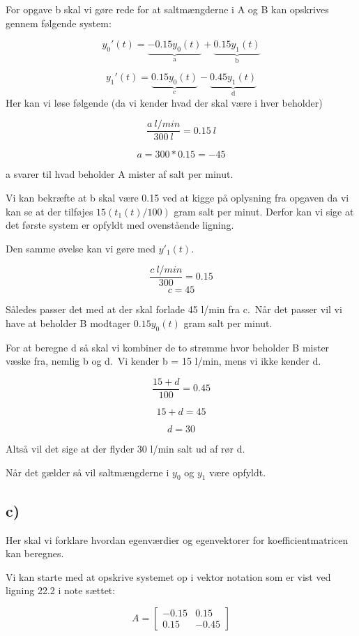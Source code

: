 \documentclass[
]{article}
\begin{document}
For opgave b skal vi gøre rede for at saltmængderne i A og B kan
opskrives gennem følgende system:

\[
y_0'(t)=\underbrace{-0.15 y_0 (t)}_\textrm{a} + \underbrace{0.15 y_1 (t)}_\textrm{b}
\]

\[
y_1'(t)=\underbrace{0.15 y_0 (t)}_\textrm{c} - \underbrace{0.45 y_1 (t)}_\textrm{d}
\] Her kan vi løse følgende (da vi kender hvad der skal være i hver
beholder)

\[
\frac{a \ l/min}{300 \ l }= 0.15 \ l
\]

\[
a = 300 * 0.15 = -45
\]

a svarer til hvad beholder A mister af salt per minut.

Vi kan bekræfte at b skal være 0.15 ved at kigge på oplysning fra
opgaven da vi kan se at der tilføjes \(15(t_1(t)/100)\) gram salt per
minut. Derfor kan vi sige at det første system er opfyldt med
ovenstående ligning.

Den samme øvelse kan vi gøre med \(y'_1(t)\).

\[
\frac{c \ l/min}{300} = 0.15
\] \[
c = 45
\]

Således passer det med at der skal forlade 45 l/min fra c.~Når det
passer vil vi have at beholder B modtager \(0.15 y_0(t)\) gram salt per
minut.

For at beregne d så skal vi kombiner de to strømme hvor beholder B
mister væske fra, nemlig b og d.~Vi kender b = 15 l/min, mens vi ikke
kender d.~

\[
\frac{15 + d}{100} = 0.45
\]

\[
15+d=45
\]

\[
d = 30
\]

Altså vil det sige at der flyder 30 l/min salt ud af rør d.

Når det gælder så vil saltmængderne i \(y_0\) og \(y_1\) være opfyldt.

\hypertarget{c}{%
\subsection{c)}\label{c}}

Her skal vi forklare hvordan egenværdier og egenvektorer for
koefficientmatricen kan beregnes.

Vi kan starte med at opskrive systemet op i vektor notation som er vist
ved ligning 22.2 i note sættet:

\[
A = \begin{bmatrix}
-0.15 &  0.15 \\
 0.15 & -0.45 
\end{bmatrix}
\]
\end{document}
